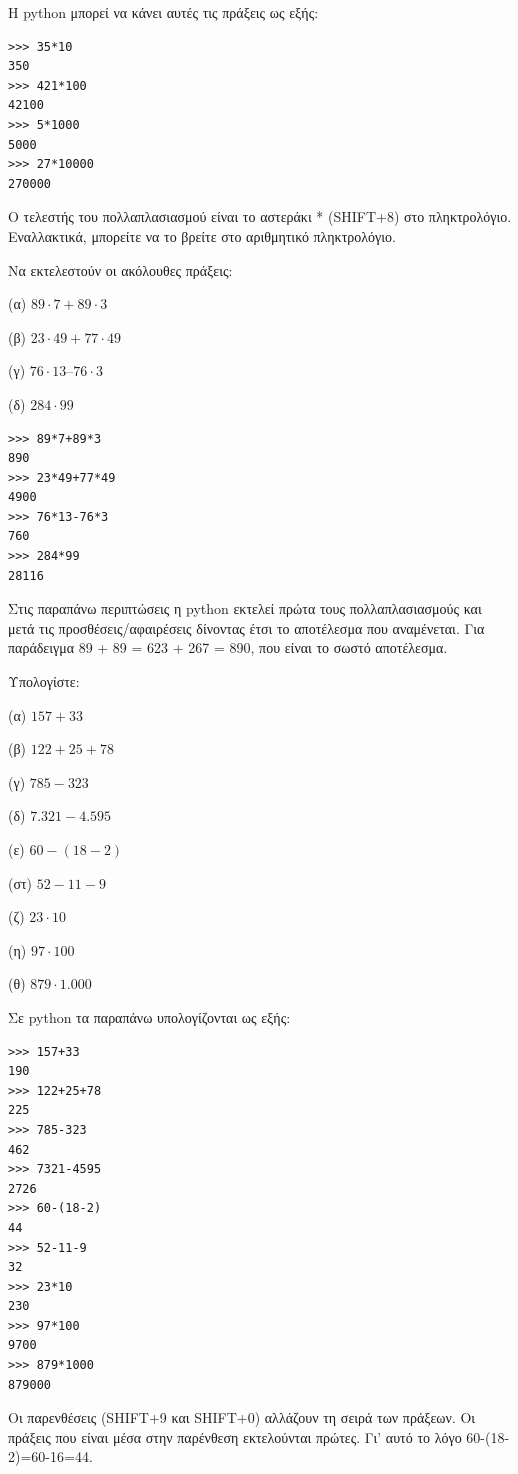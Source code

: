 Η python μπορεί να κάνει αυτές τις πράξεις ως εξής:
\begin{lstlisting}
>>> 35*10
350
>>> 421*100
42100
>>> 5*1000
5000
>>> 27*10000
270000
\end{lstlisting}

Ο τελεστής του πολλαπλασιασμού είναι το αστεράκι * (SHIFT+8) στο πληκτρολόγιο. Εναλλακτικά, μπορείτε να το βρείτε στο αριθμητικό πληκτρολόγιο. 

\begin{exercise}
Να εκτελεστούν οι ακόλουθες πράξεις:

(α) $89\cdot 7 + 89\cdot 3$

(β) $23 \cdot 49 + 77 \cdot 49$

(γ) $76 \cdot 13 – 76 \cdot 3$

(δ) $284 \cdot 99$
\end{exercise}
\begin{lstlisting}
>>> 89*7+89*3
890
>>> 23*49+77*49
4900
>>> 76*13-76*3
760
>>> 284*99
28116
\end{lstlisting}

Στις παραπάνω περιπτώσεις η python εκτελεί πρώτα τους πολλαπλασιασμούς και μετά τις προσθέσεις/αφαιρέσεις δίνοντας έτσι το αποτέλεσμα που αναμένεται. Για παράδειγμα 89 + 89 = 623 + 267 = 890, που είναι το σωστό αποτέλεσμα.

\begin{exercise}
Υπολογίστε:

(α)  $157 + 33$ 

(β)  $122 + 25 + 78$

(γ)  $785 - 323$

(δ)  $7.321 - 4.595$

(ε)  $60 - (18 - 2)$

(στ) $52 - 11 -9$

(ζ)  $23 \cdot 10$

(η)  $97 \cdot 100$

(θ)  $879 \cdot 1.000$
\end{exercise}
Σε python τα παραπάνω υπολογίζονται ως εξής:
\begin{lstlisting}
>>> 157+33
190
>>> 122+25+78
225
>>> 785-323
462
>>> 7321-4595
2726
>>> 60-(18-2)
44
>>> 52-11-9
32
>>> 23*10
230
>>> 97*100
9700
>>> 879*1000
879000
\end{lstlisting}
Οι παρενθέσεις (SHIFT+9 και SHIFT+0) αλλάζουν τη σειρά των πράξεων. Οι πράξεις που είναι μέσα στην παρένθεση εκτελούνται πρώτες. Γι' αυτό το λόγο 60-(18-2)=60-16=44.

